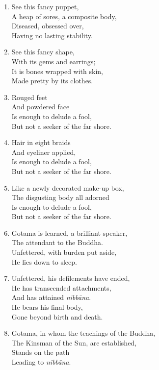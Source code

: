 \documentclass[10pt, openany]{book}
\begin{document}
\begin{enumerate}
\item See this fancy puppet,\\
A heap of sores, a composite body,\\
Diseased, obsessed over,\\
Having no lasting stability.

\item See this fancy shape,\\
With its gems and earrings;\\
It is bones wrapped with skin,\\
Made pretty by its clothes.

\item Rouged feet\\
And powdered face\\
Is enough to delude a fool,\\
But not a seeker of the far shore.

\item Hair in eight braids\\
And eyeliner applied,\\
Is enough to delude a fool,\\
But not a seeker of the far shore.

\item Like a newly decorated make-up box,\\
The disgusting body all adorned\\
 Is enough to delude a fool,\\
But not a seeker of the far shore.

\item Gotama is learned, a brilliant speaker,\\
The attendant to the Buddha.\\
Unfettered, with burden put aside,\\
He lies down to sleep.

\item Unfettered, his defilements have ended,\\
He has transcended attachments, \\
And has attained \emph{nibbāna}.\\
He bears his final body,\\
Gone beyond birth and death.

\item Gotama, in whom the teachings of the Buddha,\\
The Kinsman of the Sun, are established,\\
Stands on the path\\
Leading to \emph{nibbāna}.


\end{enumerate}
\end{document}
